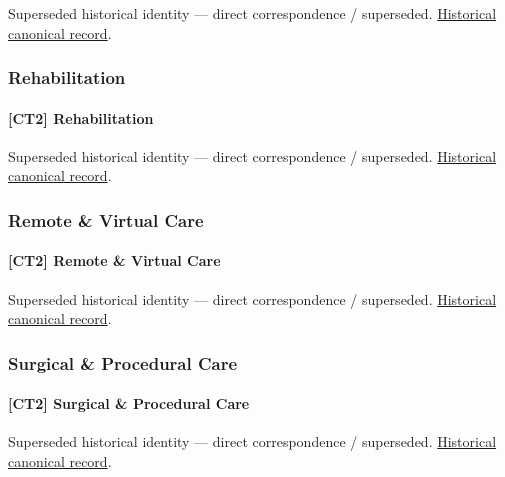 \par\label{element:fe9d58b5cfe14e8cb7a83a1ac6686d65}
Superseded historical identity — direct correspondence / superseded. \href{../../../../continuum/strategy/capability/fe9d58b5cfe14e8cb7a83a1ac6686d65.md}{Historical canonical record}.\par

\subsubsection{Rehabilitation}

\paragraph{[CT2] Rehabilitation}

\par\label{element:28ec21d5918a49aaac12740c69f42d77}
Superseded historical identity — direct correspondence / superseded. \href{../../../../continuum/strategy/capability/28ec21d5918a49aaac12740c69f42d77.md}{Historical canonical record}.\par

\subsubsection{Remote \& Virtual Care}

\paragraph{[CT2] Remote \& Virtual Care}

\par\label{element:75e2b447659c4fdf94107d94758337ed}
Superseded historical identity — direct correspondence / superseded. \href{../../../../continuum/strategy/capability/75e2b447659c4fdf94107d94758337ed.md}{Historical canonical record}.\par

\subsubsection{Surgical \& Procedural Care}

\paragraph{[CT2] Surgical \& Procedural Care}

\par\label{element:8bc2a106165a4702b5f72fe46a206b69}
Superseded historical identity — direct correspondence / superseded. \href{../../../../continuum/strategy/capability/8bc2a106165a4702b5f72fe46a206b69.md}{Historical canonical record}.\par

